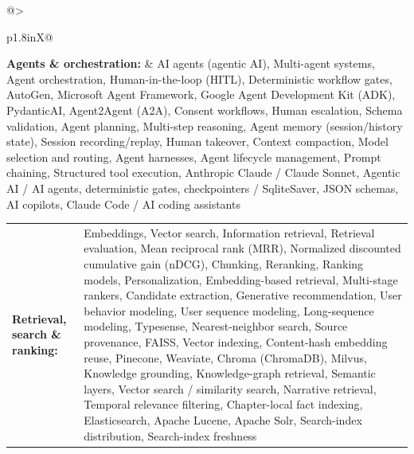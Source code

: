 \documentclass[letterpaper,11pt]{article}
\begin{document}
\par\vspace{2pt}
\begin{tabularx}{\linewidth}{@{}>{\raggedright\arraybackslash}p{1.8in}X@{}}
\textbf{Agents \& orchestration:} & \footnotesize{AI agents (agentic AI), Multi-agent systems, Agent orchestration, Human-in-the-loop (HITL), Deterministic workflow gates, AutoGen, Microsoft Agent Framework, Google Agent Development Kit (ADK), PydanticAI, Agent2Agent (A2A), Consent workflows, Human escalation, Schema validation, Agent planning, Multi-step reasoning, Agent memory (session/history state), Session recording/replay, Human takeover, Context compaction, Model selection and routing, Agent harnesses, Agent lifecycle management, Prompt chaining, Structured tool execution, Anthropic Claude / Claude Sonnet, Agentic AI / AI agents, deterministic gates, checkpointers / SqliteSaver, JSON schemas, AI copilots, Claude Code / AI coding assistants}\\
\end{tabularx}
\par\vspace{2pt}
\begin{tabularx}{\linewidth}{@{}>{\raggedright\arraybackslash}p{1.8in}X@{}}
\textbf{Retrieval, search \& ranking:} & \footnotesize{Embeddings, Vector search, Information retrieval, Retrieval evaluation, Mean reciprocal rank (MRR), Normalized discounted cumulative gain (nDCG), Chunking, Reranking, Ranking models, Personalization, Embedding-based retrieval, Multi-stage rankers, Candidate extraction, Generative recommendation, User behavior modeling, User sequence modeling, Long-sequence modeling, Typesense, Nearest-neighbor search, Source provenance, FAISS, Vector indexing, Content-hash embedding reuse, Pinecone, Weaviate, Chroma (ChromaDB), Milvus, Knowledge grounding, Knowledge-graph retrieval, Semantic layers, Vector search / similarity search, Narrative retrieval, Temporal relevance filtering, Chapter-local fact indexing, Elasticsearch, Apache Lucene, Apache Solr, Search-index distribution, Search-index freshness}\\
\end{tabularx}
\par\vspace{2pt}
\end{document}
